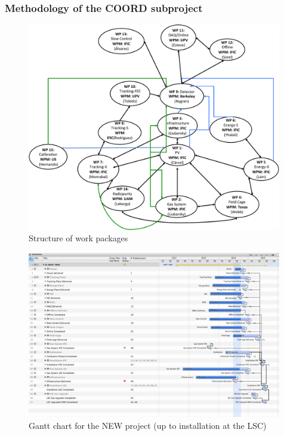 %
%

\subsubsection*{Methodology of the COORD subproject}


\begin{figure}[h!]
\begin{center}
\includegraphics[width=0.99\textwidth]{img/PMP.pdf}
\end{center}
\caption{\label{Fig:PMP}Structure of work packages}
\end{figure}

\begin{figure}[h!]
\begin{center}
\includegraphics[width=0.99\textwidth]{img/Merlin_NEW.png}
\end{center}
\caption{\label{Fig:Gantt} Gantt chart for the NEW project (up to installation at the LSC)}
\end{figure}

